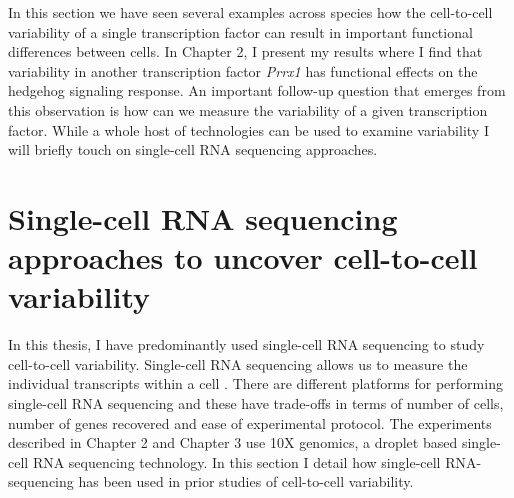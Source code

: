 In this section we have seen several examples across species how the cell-to-cell variability of a single transcription factor can result in important functional differences between cells. In Chapter 2, I present my results where I find that variability in another transcription factor \emph{Prrx1} has functional effects on the hedgehog signaling response. An important follow-up question that emerges from this observation is how can we measure the variability of a given transcription factor. While a whole host of technologies can be used to examine variability I will briefly touch on single-cell RNA sequencing approaches.

\section{Single-cell RNA sequencing approaches to uncover cell-to-cell variability}

In this thesis, I have predominantly used single-cell RNA sequencing to study cell-to-cell variability. Single-cell RNA sequencing allows us to measure the individual transcripts within a cell \cite{macosko2015c}. There are different platforms for performing single-cell RNA sequencing and these have trade-offs in terms of number of cells, number of genes recovered and ease of experimental protocol. The experiments described in Chapter 2 and Chapter 3 use 10X genomics, a droplet based single-cell RNA sequencing technology. In this section I detail how single-cell RNA-sequencing has been used in prior studies of cell-to-cell variability.

